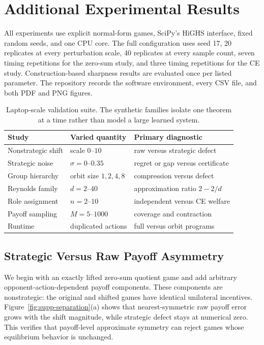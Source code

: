 \section{Additional Experimental Results}

All experiments use explicit normal-form games, SciPy's HiGHS interface, fixed random seeds, and one CPU core.  The full configuration uses seed 17, 20 replicates at every perturbation scale, 40 replicates at every sample count, seven timing repetitions for the zero-sum study, and three timing repetitions for the CE study.  Construction-based sharpness results are evaluated once per listed parameter.  The repository records the software environment, every CSV file, and both PDF and PNG figures.

\begin{table}[t]
\centering
\begin{tabular}{lll}
\toprule
Study & Varied quantity & Primary diagnostic\\
\midrule
Nonstrategic shift & scale $0$--$10$ & raw versus strategic defect\\
Strategic noise & $\sigma=0$--$0.35$ & regret or gap versus certificate\\
Group hierarchy & orbit size $1,2,4,8$ & compression versus defect\\
Reynolds family & $d=2$--$40$ & approximation ratio $2-2/d$\\
Role assignment & $n=2$--$10$ & independent versus CE welfare\\
Payoff sampling & $M=5$--$1000$ & coverage and contraction\\
Runtime & duplicated actions & full versus orbit programs\\
\bottomrule
\end{tabular}
\caption{Laptop-scale validation suite.  The synthetic families isolate one theorem at a time rather than model a large learned system.}
\label{tab:supp-studies}
\end{table}

\subsection{Strategic Versus Raw Payoff Asymmetry}

We begin with an exactly lifted zero-sum quotient game and add arbitrary opponent-action-dependent payoff components.  These components are nonstrategic: the original and shifted games have identical unilateral incentives.  Figure~\ref{fig:supp-separation}(a) shows that nearest-symmetric raw payoff error grows with the shift magnitude, while strategic defect stays at numerical zero.  This verifies that payoff-level approximate symmetry can reject games whose equilibrium behavior is unchanged.


